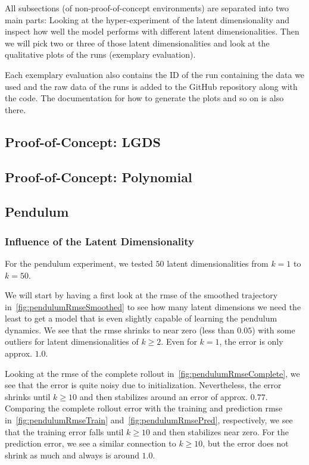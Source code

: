 	All subsections (of non-proof-of-concept environments) are separated into two main parts: Looking at the hyper-experiment of the latent dimensionality and inspect how well the model performs with different latent dimensionalities. Then we will pick two or three of those latent dimensionalities and look at the qualitative plots of the runs (exemplary evaluation).

	Each exemplary evaluation also contains the ID of the run containing the data we used and the raw data of the runs is added to the GitHub repository along with the code. The documentation for how to generate the plots and so on is also there.

	\subsection{Proof-of-Concept: LGDS}

	\subsection{Proof-of-Concept: Polynomial}

	\subsection{Pendulum}

		\subsubsection{Influence of the Latent Dimensionality}
			For the pendulum experiment, we tested \(50\) latent dimensionalities from \( k = 1 \) to \( k = 50 \).

			We will start by having a first look at the \ac{rmse} of the smoothed trajectory in~\autoref{fig:pendulumRmseSmoothed} to see how many latent dimensions we need the least to get a model that is even slightly capable of learning the pendulum dynamics. We see that the \ac{rmse} shrinks to near zero (less than \( 0.05 \)) with some outliers for latent dimensionalities of \( k \geq 2 \). Even for \( k = 1 \), the error is only approx. \( 1.0 \).

			Looking at the \ac{rmse} of the complete rollout in~\autoref{fig:pendulumRmseComplete}, we see that the error is quite noisy due to initialization. Nevertheless, the error shrinks until \( k \geq 10 \) and then stabilizes around an error of approx. \(0.77\). Comparing the complete rollout error with the training and prediction \ac{rmse} in~\autoref{fig:pendulumRmseTrain} and~\autoref{fig:pendulumRmsePred}, respectively, we see that the training error falls until \( k \geq 10 \) and then stabilizes near zero. For the prediction error, we see a similar connection to \( k \geq 10 \), but the error does not shrink as much and always is around \( 1.0 \).

